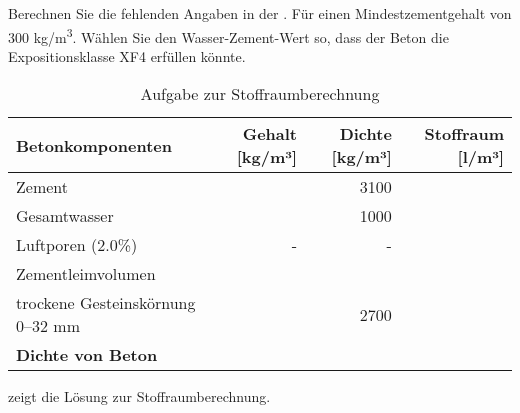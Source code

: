 \begin{questions}
    \question[4 \half] Berechnen Sie die fehlenden Angaben in der . Für einen Mindestzementgehalt von 300 kg/m\textsuperscript{3}. Wählen Sie den Wasser-Zement-Wert so, dass der Beton die Expositionsklasse XF4 erfüllen könnte.

    \begin{table}[h]
        \centering
        \caption{Aufgabe zur Stoffraumberechnung}
        \small
        \label{tab:Stoffraumberechnung}
        \begin{tabular}{lrrr}
        \toprule
        \textbf{Betonkomponenten}       & \textbf{Gehalt [kg/m³]} & \textbf{Dichte [kg/m³]} & \textbf{Stoffraum [l/m³]} \\ 
        \midrule
        Zement                           & {}                      & 3100                       &    {}          \\
        Gesamtwasser                     & {}                      & 1000                       & {}            \\
        Luftporen (2.0\%)                & -                        & -                         & {}              \\
        Zementleimvolumen                &                          &                           &                           \\
        trockene Gesteinskörnung 0–32 mm & {}                     & 2700                       & {}             \\
        \midrule
        \textbf{Dichte von Beton}                   & {}           &                           & {}             \\
        \bottomrule
        \end{tabular}
        \end{table}

        \begin{solution}
             zeigt die Lösung zur Stoffraumberechnung.


\end{solution}
\end{questions}
